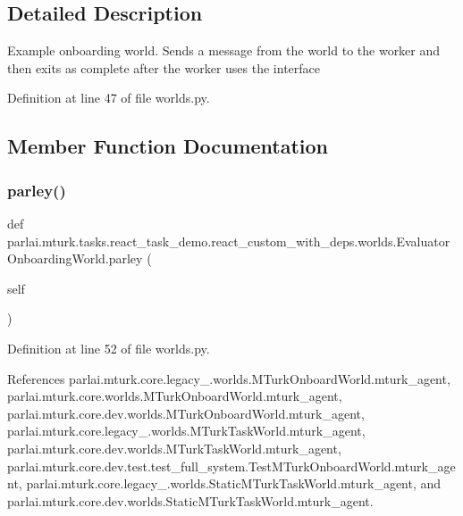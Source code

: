 \subsection{Detailed Description}
\begin{DoxyVerb}Example onboarding world. Sends a message from the world to the
worker and then exits as complete after the worker uses the interface
\end{DoxyVerb}
 

Definition at line 47 of file worlds.\+py.



\subsection{Member Function Documentation}
\mbox{\label{classparlai_1_1mturk_1_1tasks_1_1react__task__demo_1_1react__custom__with__deps_1_1worlds_1_1EvaluatorOnboardingWorld_a9e0547ae8f135a802327acff08c8a785}} 
\subsubsection{\texorpdfstring{parley()}{parley()}}
{\footnotesize\ttfamily def parlai.\+mturk.\+tasks.\+react\+\_\+task\+\_\+demo.\+react\+\_\+custom\+\_\+with\+\_\+deps.\+worlds.\+Evaluator\+Onboarding\+World.\+parley (\begin{DoxyParamCaption}\item[{}]{self }\end{DoxyParamCaption})}



Definition at line 52 of file worlds.\+py.



References parlai.\+mturk.\+core.\+legacy\+\_.\+worlds.\+M\+Turk\+Onboard\+World.\+mturk\+\_\+agent, parlai.\+mturk.\+core.\+worlds.\+M\+Turk\+Onboard\+World.\+mturk\+\_\+agent, parlai.\+mturk.\+core.\+dev.\+worlds.\+M\+Turk\+Onboard\+World.\+mturk\+\_\+agent, parlai.\+mturk.\+core.\+legacy\+\_.\+worlds.\+M\+Turk\+Task\+World.\+mturk\+\_\+agent, parlai.\+mturk.\+core.\+dev.\+worlds.\+M\+Turk\+Task\+World.\+mturk\+\_\+agent, parlai.\+mturk.\+core.\+dev.\+test.\+test\+\_\+full\+\_\+system.\+Test\+M\+Turk\+Onboard\+World.\+mturk\+\_\+agent, parlai.\+mturk.\+core.\+legacy\+\_.\+worlds.\+Static\+M\+Turk\+Task\+World.\+mturk\+\_\+agent, and parlai.\+mturk.\+core.\+dev.\+worlds.\+Static\+M\+Turk\+Task\+World.\+mturk\+\_\+agent.




